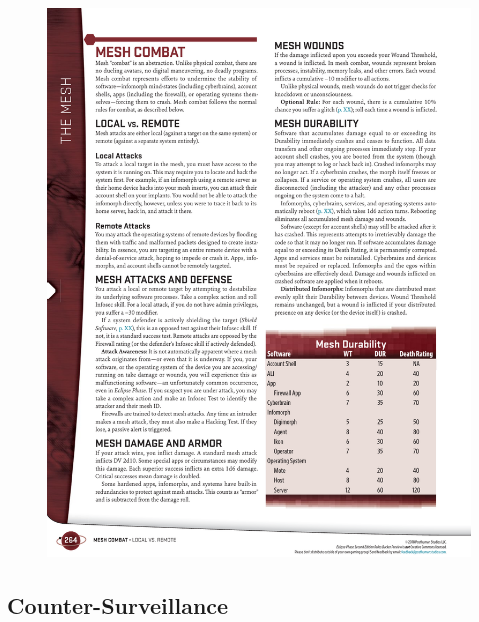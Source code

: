 \begin{figure}[htb!]%
   \includegraphics[scale=1.0]{gfx/mesh-combat}%
\end{figure}%


\subsection*{Counter-Surveillance}

